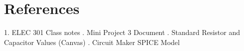 \documentclass[12pt]{article}
\begin{document}
\newpage
\section{References}
1. ELEC 301 Class notes 
. Mini Project 3 Document
. Standard Resistor and Capacitor Values (Canvas)
. Circuit Maker SPICE Model
\end{document}
